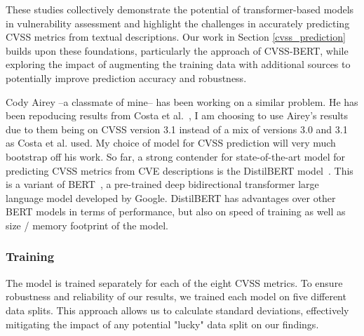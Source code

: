 \documentclass[12pt]{article}
\begin{document}
These studies collectively demonstrate the potential of transformer-based models in vulnerability
assessment and highlight the challenges in accurately predicting CVSS metrics from textual
descriptions. Our work in Section \ref{cvss_prediction} builds upon these foundations, particularly
the approach of CVSS-BERT, while exploring the impact of augmenting the training data with
additional sources to potentially improve prediction accuracy and robustness.

Cody Airey --a classmate of mine-- has been working on a similar problem. He has been repoducing
results from Costa et al.\@~\cite{costa}, I am choosing to use Airey's results due to them being on
CVSS version 3.1 instead of a mix of versions 3.0 and 3.1 as Costa et al. used. My choice of model
for CVSS prediction will very much bootstrap off his work. So far, a strong contender for
state-of-the-art model for predicting CVSS metrics from CVE descriptions is the DistilBERT
model~\cite{distilbert}. This is a variant of BERT~\cite{BERT}, a pre-trained deep bidirectional
transformer large language model developed by Google. DistilBERT has advantages over other BERT
models in terms of performance, but also on speed of training as well as size / memory footprint of
the model.

\subsubsection{Training}

The model is trained separately for each of the eight CVSS metrics. To ensure robustness and
reliability of our results, we trained each model on five different data splits. This approach
allows us to calculate standard deviations, effectively mitigating the impact of any potential
"lucky" data split on our findings.
\end{document}

